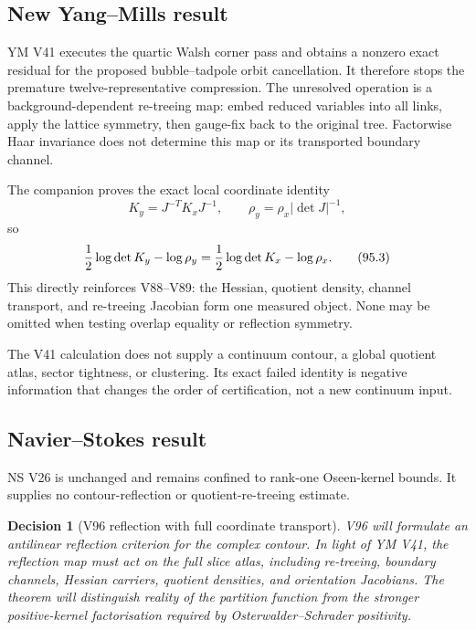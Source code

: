 \documentclass[11pt]{article}
\newtheorem{decision}[theorem]{Decision}
\begin{document}
\subsection{New Yang--Mills result}

YM V41 executes the quartic Walsh corner pass and obtains a nonzero
exact residual for the proposed bubble--tadpole orbit cancellation.
It therefore stops the premature twelve-representative compression.
The unresolved operation is a background-dependent re-treeing map:
embed reduced variables into all links, apply the lattice symmetry,
then gauge-fix back to the original tree.  Factorwise Haar invariance
does not determine this map or its transported boundary channel.

The companion proves the exact local coordinate identity
\[
 K_y=J^{-T}K_xJ^{-1},\qquad
 \rho_y=\rho_x|\det J|^{-1},                                \tag{95.2}
\]
so
\[
                    {1\over2}\log\det K_y-\log\rho_y
                    ={1\over2}\log\det K_x-\log\rho_x.       \tag{95.3}
\]
This directly reinforces V88--V89: the Hessian, quotient density,
channel transport, and re-treeing Jacobian form one measured object.
None may be omitted when testing overlap equality or reflection
symmetry.

The V41 calculation does not supply a continuum contour, a global
quotient atlas, sector tightness, or clustering.  Its exact failed
identity is negative information that changes the order of
certification, not a new continuum input.

\subsection{Navier--Stokes result}

NS V26 is unchanged and remains confined to rank-one Oseen-kernel
bounds.  It supplies no contour-reflection or quotient-re-treeing
estimate.

\begin{decision}[V96 reflection with full coordinate transport]
\label{dec:v11v95-next}
V96 will formulate an antilinear reflection criterion for the complex
contour.  In light of YM V41, the reflection map must act on the full
slice atlas, including re-treeing, boundary channels, Hessian
carriers, quotient densities, and orientation Jacobians.  The theorem
will distinguish reality of the partition function from the stronger
positive-kernel factorisation required by
Osterwalder--Schrader positivity.
\end{decision}
\end{document}
